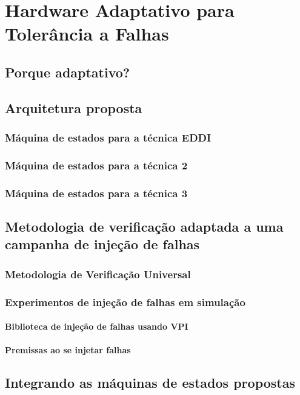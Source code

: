 \chapter{Hardware Adaptativo para Tolerância a Falhas}
\section{Porque adaptativo?}
\section{Arquitetura proposta}
	\subsection{Máquina de estados para a técnica EDDI}
	\subsection{Máquina de estados para a técnica 2}
	\subsection{Máquina de estados para a técnica 3}
\section{Metodologia de verificação adaptada a uma campanha de injeção de falhas}
\subsection{Metodologia de Verificação Universal}
\subsection{Experimentos de injeção de falhas em simulação}
\subsubsection{Biblioteca de injeção de falhas usando VPI}
\subsubsection{Premissas ao se injetar falhas}
\section{Integrando as máquinas de estados propostas}
